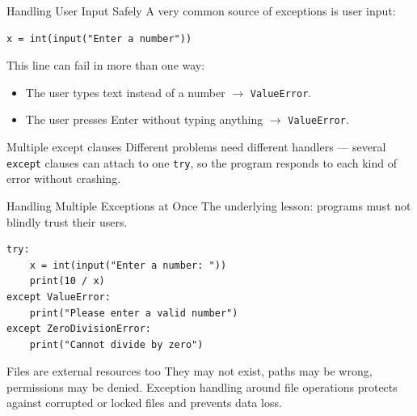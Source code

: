 \documentclass[9pt,aspectratio=169,xcolor=table]{beamer}
\begin{document}
\begin{frame}[fragile]{Handling User Input Safely}
    \leavevmode
    A very common source of exceptions is user input:

\begin{lstlisting}
x = int(input("Enter a number"))
\end{lstlisting}

    \vspace{1mm}
    This line can fail in more than one way:
    \begin{itemize}
        \item The user types text instead of a number
              $\rightarrow$ \texttt{ValueError}.
        \item The user presses Enter without typing anything
              $\rightarrow$ \texttt{ValueError}.
    \end{itemize}

    \vspace{2mm}
    \begin{block}{Multiple except clauses}
        Different problems need different handlers --- several
        \texttt{except} clauses can attach to one \texttt{try}, so the
        program responds to each kind of error without crashing.
    \end{block}
\end{frame}

\begin{frame}[fragile]{Handling Multiple Exceptions at Once}
    \leavevmode
    The underlying lesson: programs must not blindly trust their
    users.

\begin{lstlisting}
try:
    x = int(input("Enter a number: "))
    print(10 / x)
except ValueError:
    print("Please enter a valid number")
except ZeroDivisionError:
    print("Cannot divide by zero")
\end{lstlisting}

    \vspace{2mm}
    \begin{block}{Files are external resources too}
        They may not exist, paths may be wrong, permissions may be
        denied. Exception handling around file operations protects
        against corrupted or locked files and prevents data loss.
    \end{block}
\end{frame}
\end{document}
